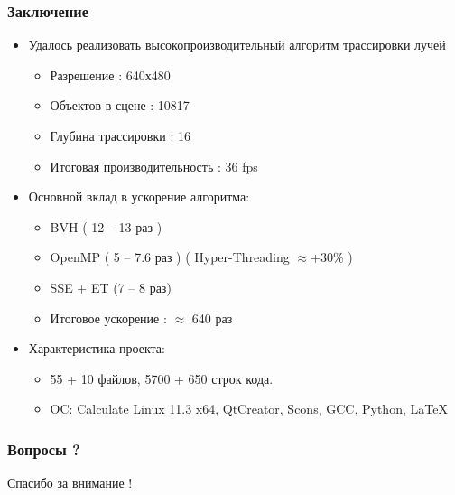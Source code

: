 \documentclass[utf8, 12pt]{beamer}
\begin{document}
\begin{frame}
\frametitle{Заключение}
\begin{itemize}
\item Удалось реализовать высокопроизводительный алгоритм трассировки лучей
\begin{itemize}
\item Разрешение : 640х480
\item Объектов в сцене : 10817
\item Глубина трассировки : 16 
\item Итоговая производительность : 36 fps
\end{itemize}
\item Основной вклад в ускорение алгоритма:
\begin{itemize}
\item BVH ( 12 -- 13 раз )
\item OpenMP ( 5 -- 7.6 раз ) ( Hyper-Threading $\approx$+30\% )
\item SSE + ET (7 -- 8 раз)
\item Итоговое ускорение : $\approx$ 640 раз
\end{itemize}
\item Характеристика проекта:
\begin{itemize}
\item 55 + 10 файлов, 5700 + 650 строк кода.
\item OC: Calculate Linux 11.3 x64, QtCreator, Scons, GCC, Python, \LaTeX
\end{itemize}
\end{itemize}
\end{frame}

\begin{frame}
\frametitle{Вопросы ?}
\begin{center}
{\huge Спасибо за внимание !}
\end{center}
\end{frame}
\end{document}
